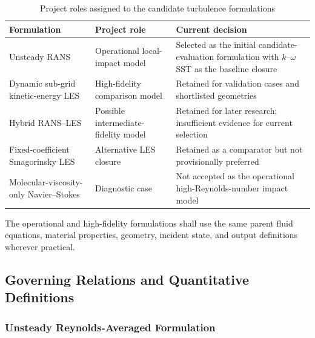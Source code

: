 \begin{table}[htbp]
  \centering
  \small
  \renewcommand{\arraystretch}{1.25}
  \begin{tabular}{
      p{}
      p{}
      p{}
    }
    \hline
    Formulation
    &
    Project role
    &
    Current decision
    \\
    \hline
    Unsteady RANS
    &
    Operational local-impact model
    &
    Selected as the initial candidate-evaluation formulation with
    $k$--$\omega$ SST as the baseline closure
    \\
    Dynamic sub-grid kinetic-energy LES
    &
    High-fidelity comparison model
    &
    Retained for validation cases and shortlisted geometries
    \\
    Hybrid RANS--LES
    &
    Possible intermediate-fidelity model
    &
    Retained for later research; insufficient evidence for current
    selection
    \\
    Fixed-coefficient Smagorinsky LES
    &
    Alternative LES closure
    &
    Retained as a comparator but not provisionally preferred
    \\
    Molecular-viscosity-only Navier--Stokes
    &
    Diagnostic case
    &
    Not accepted as the operational high-Reynolds-number impact
    model
    \\
    \hline
  \end{tabular}
  \caption{Project roles assigned to the candidate turbulence
  formulations}
  \label{tab:res-mod-src-local-turbulence-hierarchy}
\end{table}

The operational and high-fidelity formulations shall use the same
parent fluid equations, material properties, geometry, incident state,
and output definitions wherever practical.

\subsection{Governing Relations and Quantitative Definitions}
\label{sec:res-mod-src-governing-relations}

%

\subsubsection{Unsteady Reynolds-Averaged Formulation}
\label{sec:res-mod-src-local-urans}

